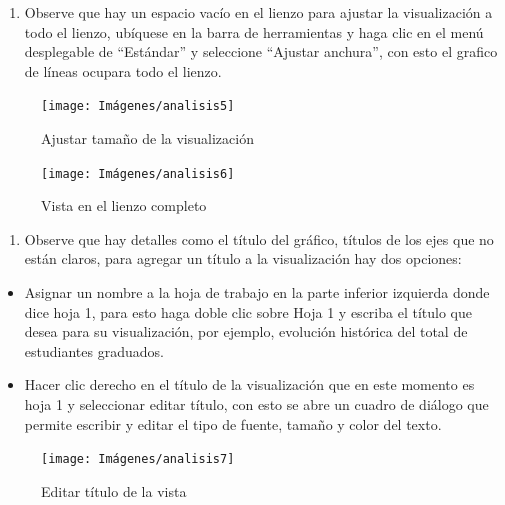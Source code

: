 \documentclass[
]{book}
\providecommand{\tightlist}{%
  \setlength{\itemsep}{0pt}\setlength{\parskip}{0pt}}
\begin{document}
\begin{enumerate}
\def\labelenumi{\arabic{enumi}.}
\setcounter{enumi}{3}
\tightlist
\item
  Observe que hay un espacio vacío en el lienzo para ajustar la visualización a todo el lienzo, ubíquese en la barra de herramientas y haga clic en el menú desplegable de ``Estándar'' y seleccione ``Ajustar anchura'', con esto el grafico de líneas ocupara todo el lienzo.
\end{enumerate}

\begin{figure}

{\centering \texttt{[image: Imágenes/analisis5]} 

}

\caption{Ajustar tamaño de la visualización}\label{fig:paso4lineas-fig}
\end{figure}
\begin{figure}

{\centering \texttt{[image: Imágenes/analisis6]} 

}

\caption{Vista en el lienzo completo}\label{fig:paso4-1lineas-fig}
\end{figure}

\begin{enumerate}
\def\labelenumi{\arabic{enumi}.}
\setcounter{enumi}{4}
\tightlist
\item
  Observe que hay detalles como el título del gráfico, títulos de los ejes que no están claros, para agregar un título a la visualización hay dos opciones:
\end{enumerate}

\begin{itemize}
\item
  Asignar un nombre a la hoja de trabajo en la parte inferior izquierda donde dice hoja 1, para esto haga doble clic sobre Hoja 1 y escriba el título que desea para su visualización, por ejemplo, evolución histórica del total de estudiantes graduados.
\item
  Hacer clic derecho en el título de la visualización que en este momento es hoja 1 y seleccionar editar título, con esto se abre un cuadro de diálogo que permite escribir y editar el tipo de fuente, tamaño y color del texto.
\end{itemize}

\begin{figure}

{\centering \texttt{[image: Imágenes/analisis7]} 

}

\caption{Editar título de la vista}\label{fig:paso5-11lineas-fig}
\end{figure}
\end{document}
